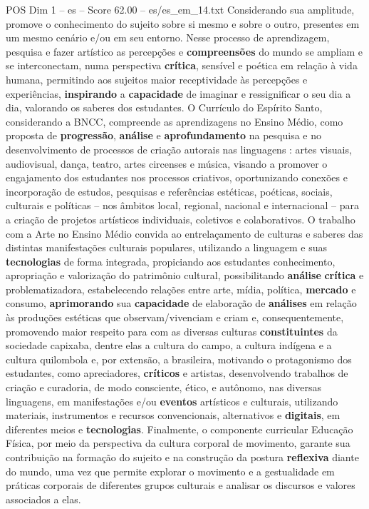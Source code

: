 \begin{textsample}{POS Dim 1 – es – Score 62.00 – es/es\_em\_14.txt}
Considerando sua amplitude, promove o conhecimento do sujeito sobre si mesmo e sobre o outro, presentes em um mesmo cenário e/ou em seu entorno.
Nesse processo de aprendizagem, pesquisa e fazer artístico as percepções e \textbf{compreensões} do mundo se ampliam e se interconectam, numa perspectiva \textbf{crítica}, sensível e poética em relação à vida humana, permitindo aos sujeitos maior receptividade às percepções e experiências, \textbf{inspirando} a \textbf{capacidade} de imaginar e ressignificar o seu dia a dia, valorando os saberes dos estudantes.
O Currículo do Espírito Santo, considerando a BNCC, compreende as aprendizagens no Ensino Médio, como proposta de \textbf{progressão}, \textbf{análise} e \textbf{aprofundamento} na pesquisa e no desenvolvimento de processos de criação autorais nas linguagens : artes visuais, audiovisual, dança, teatro, artes circenses e música, visando a promover o engajamento dos estudantes nos processos criativos, oportunizando conexões e incorporação de estudos, pesquisas e referências estéticas, poéticas, sociais, culturais e políticas – nos âmbitos local, regional, nacional e internacional – para a criação de projetos artísticos individuais, coletivos e colaborativos.
O trabalho com a Arte no Ensino Médio convida ao entrelaçamento de culturas e saberes das distintas manifestações culturais populares, utilizando a linguagem e suas \textbf{tecnologias} de forma integrada, propiciando aos estudantes conhecimento, apropriação e valorização do patrimônio cultural, possibilitando \textbf{análise} \textbf{crítica} e problematizadora, estabelecendo relações entre arte, mídia, política, \textbf{mercado} e consumo, \textbf{aprimorando} sua \textbf{capacidade} de elaboração de \textbf{análises} em relação às produções estéticas que observam/vivenciam e criam e, consequentemente, promovendo maior respeito para com as diversas culturas \textbf{constituintes} da sociedade capixaba, dentre elas a cultura do campo, a cultura indígena e a cultura quilombola e, por extensão, a brasileira, motivando o protagonismo dos estudantes, como apreciadores, \textbf{críticos} e artistas, desenvolvendo trabalhos de criação e curadoria, de modo consciente, ético, e autônomo, nas diversas linguagens, em manifestações e/ou \textbf{eventos} artísticos e culturais, utilizando materiais, instrumentos e recursos convencionais, alternativos e \textbf{digitais}, em diferentes meios e \textbf{tecnologias}.
Finalmente, o componente curricular Educação Física, por meio da perspectiva da cultura corporal de movimento, garante sua contribuição na formação do sujeito e na construção da postura \textbf{reflexiva} diante do mundo, uma vez que permite explorar o movimento e a gestualidade em práticas corporais de diferentes grupos culturais e analisar os discursos e valores associados a elas.

\end{textsample}
